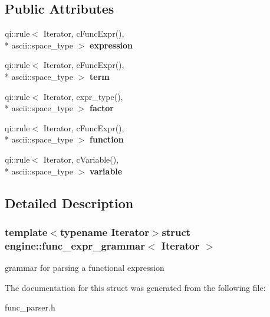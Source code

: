 \subsection*{Public Attributes}
\begin{DoxyCompactItemize}
\item 
\hypertarget{structengine_1_1func__expr__grammar_adee49e48cc3ccd215e5a3f963c8e6cc7}{qi\-::rule$<$ Iterator, c\-Func\-Expr(), \\*
ascii\-::space\-\_\-type $>$ {\bfseries expression}}\label{structengine_1_1func__expr__grammar_adee49e48cc3ccd215e5a3f963c8e6cc7}

\item 
\hypertarget{structengine_1_1func__expr__grammar_adade3a3203d20f446ee6500b43b448a2}{qi\-::rule$<$ Iterator, c\-Func\-Expr(), \\*
ascii\-::space\-\_\-type $>$ {\bfseries term}}\label{structengine_1_1func__expr__grammar_adade3a3203d20f446ee6500b43b448a2}

\item 
\hypertarget{structengine_1_1func__expr__grammar_a7ff6566ca84436e21771768643bafe8c}{qi\-::rule$<$ Iterator, expr\-\_\-type(), \\*
ascii\-::space\-\_\-type $>$ {\bfseries factor}}\label{structengine_1_1func__expr__grammar_a7ff6566ca84436e21771768643bafe8c}

\item 
\hypertarget{structengine_1_1func__expr__grammar_af8ed8e95831d375128f71292e64c92ad}{qi\-::rule$<$ Iterator, c\-Func\-Expr(), \\*
ascii\-::space\-\_\-type $>$ {\bfseries function}}\label{structengine_1_1func__expr__grammar_af8ed8e95831d375128f71292e64c92ad}

\item 
\hypertarget{structengine_1_1func__expr__grammar_a7dc51b716cdd1badb301042b84dbd427}{qi\-::rule$<$ Iterator, c\-Variable(), \\*
ascii\-::space\-\_\-type $>$ {\bfseries variable}}\label{structengine_1_1func__expr__grammar_a7dc51b716cdd1badb301042b84dbd427}

\end{DoxyCompactItemize}


\subsection{Detailed Description}
\subsubsection*{template$<$typename Iterator$>$struct engine\-::func\-\_\-expr\-\_\-grammar$<$ Iterator $>$}

grammar for parsing a functional expression 

The documentation for this struct was generated from the following file\-:\begin{DoxyCompactItemize}
\item 
func\-\_\-parser.\-h\end{DoxyCompactItemize}
